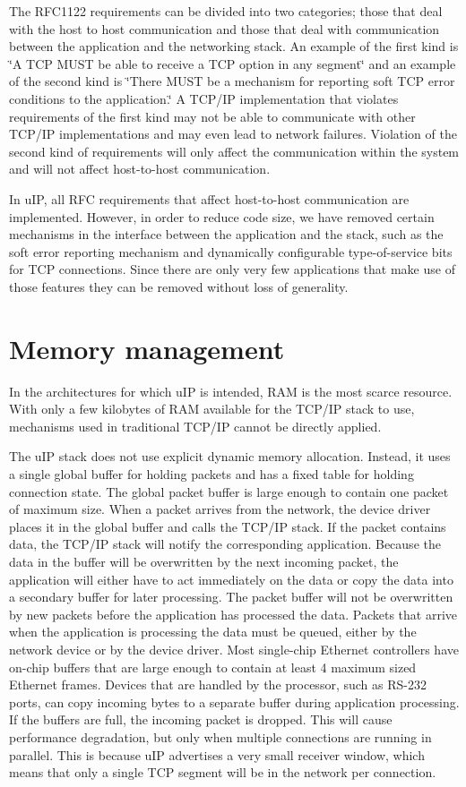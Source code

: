 The RFC1122 requirements can be divided into two categories; those that deal with the host to host communication and those that deal with communication between the application and the networking stack. An example of the first kind is \char`\"{}A TCP MUST be able to receive a TCP option in any segment\char`\"{} and an example of the second kind is \char`\"{}There MUST be a mechanism for reporting soft TCP error conditions to the application.\char`\"{} A TCP/IP implementation that violates requirements of the first kind may not be able to communicate with other TCP/IP implementations and may even lead to network failures. Violation of the second kind of requirements will only affect the communication within the system and will not affect host-to-host communication.

In u\-IP, all RFC requirements that affect host-to-host communication are implemented. However, in order to reduce code size, we have removed certain mechanisms in the interface between the application and the stack, such as the soft error reporting mechanism and dynamically configurable type-of-service bits for TCP connections. Since there are only very few applications that make use of those features they can be removed without loss of generality.\hypertarget{main_memory}{}\section{Memory management}\label{main_memory}
In the architectures for which u\-IP is intended, RAM is the most scarce resource. With only a few kilobytes of RAM available for the TCP/IP stack to use, mechanisms used in traditional TCP/IP cannot be directly applied.

The u\-IP stack does not use explicit dynamic memory allocation. Instead, it uses a single global buffer for holding packets and has a fixed table for holding connection state. The global packet buffer is large enough to contain one packet of maximum size. When a packet arrives from the network, the device driver places it in the global buffer and calls the TCP/IP stack. If the packet contains data, the TCP/IP stack will notify the corresponding application. Because the data in the buffer will be overwritten by the next incoming packet, the application will either have to act immediately on the data or copy the data into a secondary buffer for later processing. The packet buffer will not be overwritten by new packets before the application has processed the data. Packets that arrive when the application is processing the data must be queued, either by the network device or by the device driver. Most single-chip Ethernet controllers have on-chip buffers that are large enough to contain at least 4 maximum sized Ethernet frames. Devices that are handled by the processor, such as RS-232 ports, can copy incoming bytes to a separate buffer during application processing. If the buffers are full, the incoming packet is dropped. This will cause performance degradation, but only when multiple connections are running in parallel. This is because u\-IP advertises a very small receiver window, which means that only a single TCP segment will be in the network per connection.

